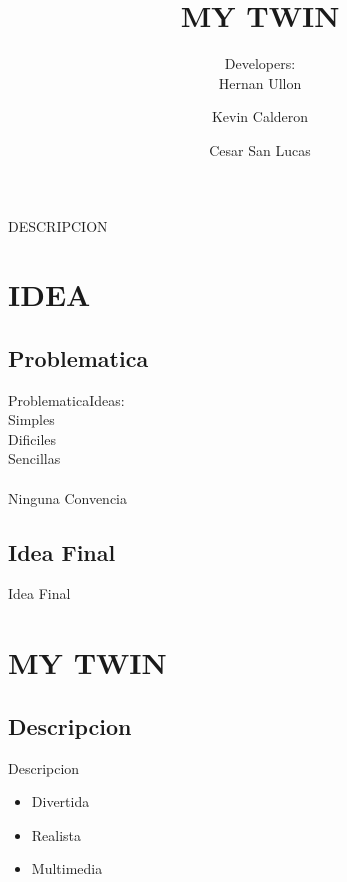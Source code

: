 \documentclass{beamer}
\title[Titre court] 
{MY TWIN}
\subtitle {}
\author[] 
{Developers: \\Hernan Ullon\inst{1} \and Kevin Calderon\inst{2}  \and Cesar San Lucas\inst{3}}
\begin{document}
\begin{frame}
  \titlepage
\end{frame}

\begin{frame}{DESCRIPCION}
  \tableofcontents
\end{frame}


\section{IDEA}

\subsection{Problematica}

\begin{frame}{Problematica}{Ideas:\\Simples\\Dificiles\\Sencillas\\\\Ninguna Convencia}




\end{frame}

\subsection{Idea Final}

\begin{frame}{Idea Final}


\end{frame}




\section{MY TWIN}

\subsection{Descripcion}

\begin{frame}{Descripcion}
\begin{itemize}
\item
    Divertida\pause
    \item
     Realista\pause
    \item
    Multimedia

    \end{itemize}
\end{frame}
\end{document}
